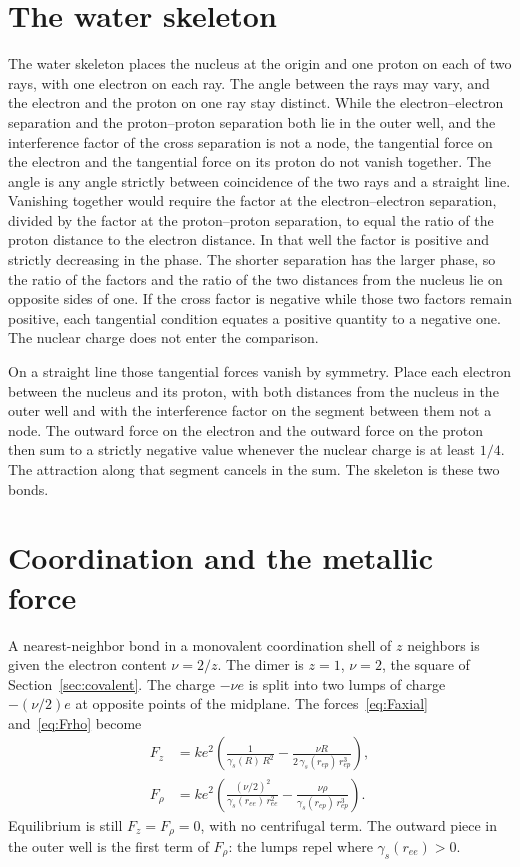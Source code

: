\documentclass[a4paper]{article}
\begin{document}
\section{The water skeleton}
\label{sec:water}

The water skeleton places the nucleus at the origin and one proton on each of two rays, with one electron on each ray. The angle between the rays may vary, and the electron and the proton on one ray stay distinct. While the electron--electron separation and the proton--proton separation both lie in the outer well, and the interference factor of the cross separation is not a node, the tangential force on the electron and the tangential force on its proton do not vanish together. The angle is any angle strictly between coincidence of the two rays and a straight line. Vanishing together would require the factor at the electron--electron separation, divided by the factor at the proton--proton separation, to equal the ratio of the proton distance to the electron distance. In that well the factor is positive and strictly decreasing in the phase. The shorter separation has the larger phase, so the ratio of the factors and the ratio of the two distances from the nucleus lie on opposite sides of one. If the cross factor is negative while those two factors remain positive, each tangential condition equates a positive quantity to a negative one. The nuclear charge does not enter the comparison.

On a straight line those tangential forces vanish by symmetry. Place each electron between the nucleus and its proton, with both distances from the nucleus in the outer well and with the interference factor on the segment between them not a node. The outward force on the electron and the outward force on the proton then sum to a strictly negative value whenever the nuclear charge is at least \(1/4\). The attraction along that segment cancels in the sum. The skeleton is these two bonds.

\section{Coordination and the metallic force}
\label{sec:metal}

A nearest-neighbor bond in a monovalent coordination shell of \(z\) neighbors is given the electron content \(\nu=2/z\). The dimer is \(z=1\), \(\nu=2\), the square of Section~\ref{sec:covalent}. The charge \(-\nu e\) is split into two lumps of charge \(-(\nu/2)e\) at opposite points of the midplane. The forces~\eqref{eq:Faxial} and~\eqref{eq:Frho} become
\begin{align}
F_z
  &=k e^{2}\left(
    \frac{1}{\gamma_s(R)\,R^{2}}
    -\frac{\nu R}{2\,\gamma_s(r_{ep})\,r_{ep}^{3}}
  \right),
\label{eq:Fznu}\\
F_{\rho}
  &=k e^{2}\left(
    \frac{(\nu/2)^{2}}{\gamma_s(r_{ee})\,r_{ee}^{2}}
    -\frac{\nu\rho}{\gamma_s(r_{ep})\,r_{ep}^{3}}
  \right).
\end{align}
Equilibrium is still \(F_z=F_{\rho}=0\), with no centrifugal term. The outward piece in the outer well is the first term of \(F_{\rho}\): the lumps repel where \(\gamma_s(r_{ee})>0\).
\end{document}
